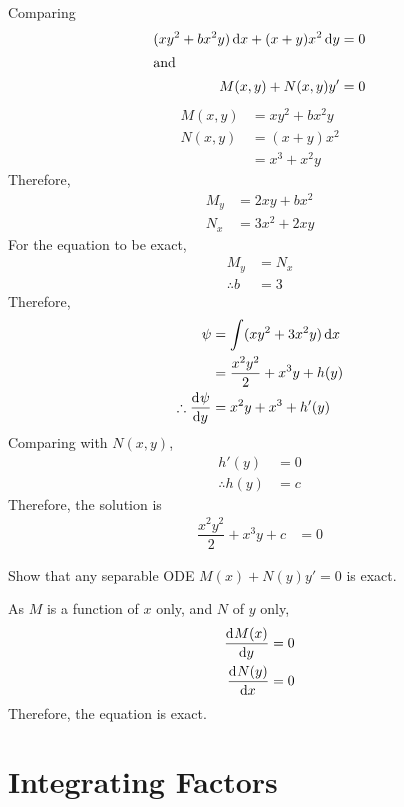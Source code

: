 \documentclass[fleqn, a4paper, 12pt, oneside]{amsart}
\theoremstyle{definition}
\theoremstyle{theorem}
\begin{document}
\begin{solution}
	Comparing
	\begin{align*}
		(x y^2 + b x^2 y) \dif x + (x + y) x^2 \dif y &= 0\\
		\intertext{and}
		M(x,y) + N(x,y) y' &= 0
	\end{align*}
	\begin{align*}
		M(x,y) &= x y^2 + b x^2 y\\
		N(x,y) &= (x + y) x^2\\
		&= x^3 + x^2 y
	\end{align*}
	Therefore,
	\begin{align*}
		M_y &= 2 x y + b x^2\\
		N_x &= 3 x^2 + 2 x y
	\end{align*}
	For the equation to be exact,
	\begin{align*}
		M_y &= N_x\\
		\therefore b &= 3
	\end{align*}
	Therefore,
	\begin{align*}
		\psi &= \int (x y^2 + 3 x^2 y) \dif x\\
		&= \dfrac{x^2 y^2}{2} + x^3 y + h(y)\\
		\therefore \dod{\psi}{y} &= x^2 y + x^3 + h'(y)
	\end{align*}
	Comparing with $N(x,y)$,
	\begin{align*}
		h'(y) &= 0\\
		\therefore h(y) &= c
	\end{align*}
	Therefore, the solution is
	\begin{align*}
		\dfrac{x^2 y^2}{2} + x^3 y + c &= 0
	\end{align*}
\end{solution}

\begin{question}
	Show that any separable ODE $M(x) + N(y)y′ = 0$ is exact.
\end{question}

\begin{solution}
	As $M$ is a function of $x$ only, and $N$ of $y$ only,
	\begin{align*}
		\dod{M(x)}{y} &= 0\\
		\dod{N(y)}{x} &= 0
	\end{align*}
	Therefore, the equation is exact.
\end{solution}

\part{Integrating Factors}
\end{document}
